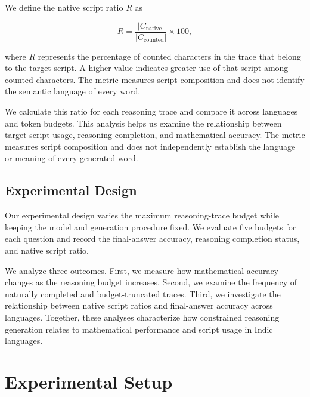 \documentclass[11pt]{article}
\begin{document}
We define the native script ratio $R$ as

\begin{equation}
    R = \frac{|C_{\text{native}}|}{|C_{\text{counted}}|} \times 100,
    \label{eq:ratio}
\end{equation}

where $R$ represents the percentage of counted characters in the trace that belong to the target script. A higher value indicates greater use of that script among counted characters. The metric measures script composition and does not identify the semantic language of every word.

We calculate this ratio for each reasoning trace and compare it across languages and token budgets. This analysis helps us examine the relationship between target-script usage, reasoning completion, and mathematical accuracy. The metric measures script composition and does not independently establish the language or meaning of every generated word.

\subsection{Experimental Design}
\label{sec:method_design}
Our experimental design varies the maximum reasoning-trace budget while keeping the model and generation procedure fixed. We evaluate five budgets for each question and record the final-answer accuracy, reasoning completion status, and native script ratio.

We analyze three outcomes. First, we measure how mathematical accuracy changes as the reasoning budget increases. Second, we examine the frequency of naturally completed and budget-truncated traces. Third, we investigate the relationship between native script ratios and final-answer accuracy across languages. Together, these analyses characterize how constrained reasoning generation relates to mathematical performance and script usage in Indic languages.

\section{Experimental Setup}
\label{sec:experimental_setup}
\end{document}
